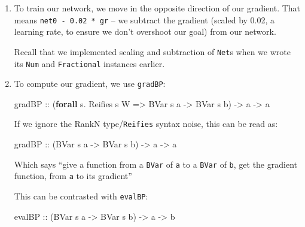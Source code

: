 \documentclass[]{article}
\newenvironment{Shaded}{}{}
\newcommand{\DataTypeTok}[1]{\textcolor[rgb]{0.56,0.13,0.00}{#1}}
\newcommand{\KeywordTok}[1]{\textcolor[rgb]{0.00,0.44,0.13}{\textbf{#1}}}
\newcommand{\NormalTok}[1]{#1}
\newcommand{\OperatorTok}[1]{\textcolor[rgb]{0.40,0.40,0.40}{#1}}
\newcommand{\OtherTok}[1]{\textcolor[rgb]{0.00,0.44,0.13}{#1}}
\begin{document}
\begin{enumerate}
\def\labelenumi{\arabic{enumi}.}
\item
  To train our network, we move in the opposite direction of our gradient. That
  means \texttt{net0\ -\ 0.02\ *\ gr} -- we subtract the gradient (scaled by
  0.02, a learning rate, to ensure we don't overshoot our goal) from our
  network.

  Recall that we implemented scaling and subtraction of \texttt{Net}s when we
  wrote its \texttt{Num} and \texttt{Fractional} instances earlier.
\item
  To compute our gradient, we use \texttt{gradBP}:

\begin{Shaded}
\begin{Highlighting}[]
\OtherTok{gradBP ::}\NormalTok{ (}\KeywordTok{forall}\NormalTok{ s}\OperatorTok{.} \DataTypeTok{Reifies}\NormalTok{ s }\DataTypeTok{W} \OtherTok{=\textgreater{}} \DataTypeTok{BVar}\NormalTok{ s a }\OtherTok{{-}\textgreater{}} \DataTypeTok{BVar}\NormalTok{ s b) }\OtherTok{{-}\textgreater{}}\NormalTok{ a }\OtherTok{{-}\textgreater{}}\NormalTok{ a}
\end{Highlighting}
\end{Shaded}

  If we ignore the RankN type/\texttt{Reifies} syntax noise, this can be read
  as:

\begin{Shaded}
\begin{Highlighting}[]
\OtherTok{gradBP ::}\NormalTok{ (}\DataTypeTok{BVar}\NormalTok{ s a }\OtherTok{{-}\textgreater{}} \DataTypeTok{BVar}\NormalTok{ s b) }\OtherTok{{-}\textgreater{}}\NormalTok{ a }\OtherTok{{-}\textgreater{}}\NormalTok{ a}
\end{Highlighting}
\end{Shaded}

  Which says ``give a function from a \texttt{BVar} of \texttt{a} to a
  \texttt{BVar} of \texttt{b}, get the gradient function, from \texttt{a} to its
  gradient''

  This can be contrasted with \texttt{evalBP}:

\begin{Shaded}
\begin{Highlighting}[]
\OtherTok{evalBP ::}\NormalTok{ (}\DataTypeTok{BVar}\NormalTok{ s a }\OtherTok{{-}\textgreater{}} \DataTypeTok{BVar}\NormalTok{ s b) }\OtherTok{{-}\textgreater{}}\NormalTok{ a }\OtherTok{{-}\textgreater{}}\NormalTok{ b}
\end{Highlighting}
\end{Shaded}


\end{enumerate}
\end{document}
